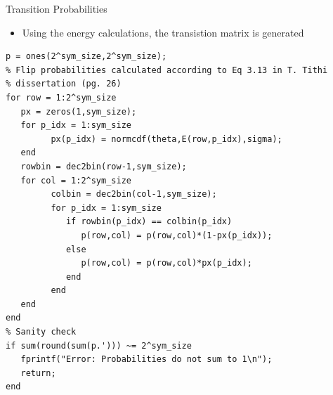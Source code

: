 \documentclass[10pt,ignorenonframetext,]{beamer}
\providecommand{\tightlist}{%
  \setlength{\itemsep}{0pt}\setlength{\parskip}{0pt}}
\begin{document}
\begin{frame}[fragile]{Transition Probabilities}
\protect\hypertarget{transition-probabilities}{}
\begin{itemize}[<+->]
\tightlist
\item
  Using the energy calculations, the transistion matrix is generated
\end{itemize}

\begin{verbatim}
p = ones(2^sym_size,2^sym_size);
% Flip probabilities calculated according to Eq 3.13 in T. Tithi
% dissertation (pg. 26)
for row = 1:2^sym_size
   px = zeros(1,sym_size);
   for p_idx = 1:sym_size
         px(p_idx) = normcdf(theta,E(row,p_idx),sigma);
   end
   rowbin = dec2bin(row-1,sym_size);
   for col = 1:2^sym_size
         colbin = dec2bin(col-1,sym_size);
         for p_idx = 1:sym_size
            if rowbin(p_idx) == colbin(p_idx)
               p(row,col) = p(row,col)*(1-px(p_idx));
            else
               p(row,col) = p(row,col)*px(p_idx);
            end
         end
   end
end
% Sanity check
if sum(round(sum(p.'))) ~= 2^sym_size
   fprintf("Error: Probabilities do not sum to 1\n");
   return;
end
\end{verbatim}
\end{frame}
\end{document}
